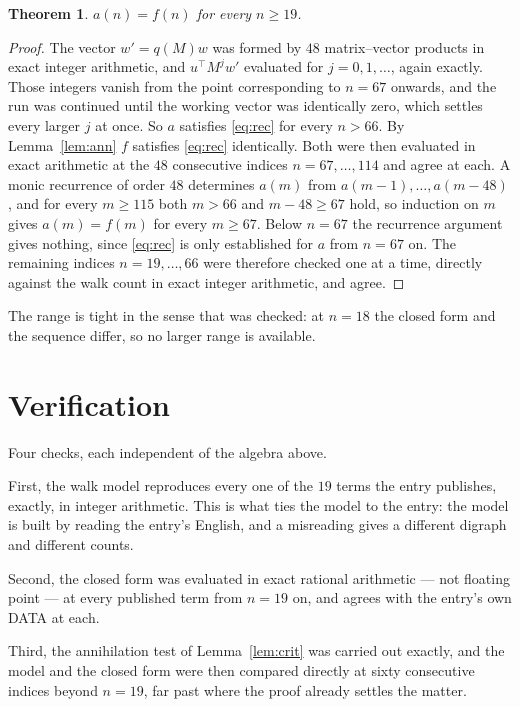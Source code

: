 \documentclass[11pt,a4paper]{article}
\theoremstyle{plain}
\newtheorem{theorem}{Theorem}
\theoremstyle{definition}
\begin{document}
\begin{theorem}
$a(n)=f(n)$ for every $n\ge19$.
\end{theorem}

\begin{proof}
The vector $w'=q(M)w$ was formed by $48$ matrix--vector products in exact integer
arithmetic, and $u^{\!\top}M^{j}w'$ evaluated for $j=0,1,\dots$, again exactly. Those integers
vanish from the point corresponding to $n=67$ onwards, and the run was continued until the
working vector was identically zero, which settles every larger $j$ at once. So $a$ satisfies
\eqref{eq:rec} for every $n>66$. By Lemma~\ref{lem:ann} $f$ satisfies \eqref{eq:rec}
identically. Both were then evaluated in exact arithmetic at the $48$ consecutive indices
$n=67,\dots,114$ and agree at each. A monic recurrence of order $48$
determines $a(m)$ from $a(m-1),\dots,a(m-48)$, and for every $m\ge115$ both
$m>66$ and $m-48\ge67$ hold, so induction on $m$ gives $a(m)=f(m)$ for every
$m\ge67$.
Below $n=67$ the recurrence argument gives nothing, since \eqref{eq:rec} is only
established for $a$ from $n=67$ on. The remaining indices $n=19,\dots,66$ were
therefore checked one at a time, directly against the walk count in exact integer arithmetic,
and agree.
\end{proof}

The range is tight in the sense that was checked: at $n=18$ the closed form and the sequence differ, so no larger range is available.

\section{Verification}

Four checks, each independent of the algebra above.

First, the walk model reproduces every one of the $19$ terms the entry publishes,
exactly, in integer arithmetic. This is what ties the model to the entry: the model is built
by reading the entry's English, and a misreading gives a different digraph and different
counts.

Second, the closed form was evaluated in exact rational arithmetic --- not floating point ---
at every published term from $n=19$ on, and agrees with the entry's own DATA at each.

Third, the annihilation test of Lemma~\ref{lem:crit} was carried out exactly, and the model
and the closed form were then compared directly at sixty consecutive indices beyond
$n=19$, far past where the proof already settles the matter.
\end{document}

